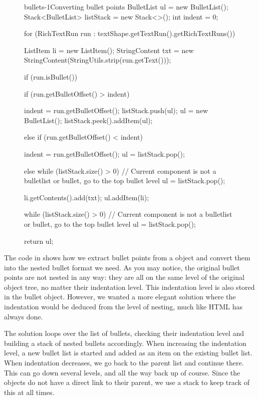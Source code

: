      \begin{figure}[h!]
      \begin{lstjava}{bullets-1}{Converting bullet points}
BulletList ul = new BulletList();
Stack<BulletList> listStack = new Stack<>();
int indent = 0;

for (RichTextRun run : textShape.getTextRun().getRichTextRuns()) {
  ListItem li = new ListItem();
  StringContent txt = new StringContent(StringUtils.strip(run.getText()));

  if (run.isBullet()) {
    if (run.getBulletOffset() > indent) {

      indent = run.getBulletOffset();
      listStack.push(ul);
      ul = new BulletList();
      listStack.peek().addItem(ul);

    } else if (run.getBulletOffset() < indent) {

      indent = run.getBulletOffset();
      ul = listStack.pop();

    }
  } else {
    while (listStack.size() > 0) {
//  Current component is not a bulletlist or bullet, go to the top bullet level
      ul = listStack.pop();
    }
  }

  li.getContents().add(txt);
  ul.addItem(li);
}

while (listStack.size() > 0) {
  // Current component is not a bulletlist or bullet, go to the top bullet level
  ul = listStack.pop();
}

return ul;
      \end{lstjava}
     \end{figure}

    The code in  shows how we extract bullet points from a
     object and convert them into the nested bullet format we
    need. As you may notice, the original bullet points are not nested in any
    way: they are all on the same level of the original object tree, no matter
    their indentation level. This indentation level is also stored in the
    bullet object. However, we wanted a more elegant solution where the
    indentation would be deduced from the level of nesting, much like HTML has
    always done.

    The solution loops over the list of bullets, checking their indentation
    level and building a stack of nested bullets accordingly. When increasing
    the indentation level, a new bullet list is started and added as an item on
    the existing bullet list. When indentation decreases, we go back to the
    parent list and continue there. This can go down several levels, and all
    the way back up of course. Since the objects do not have a direct link to
    their parent, we use a stack to keep track of this at all times.

